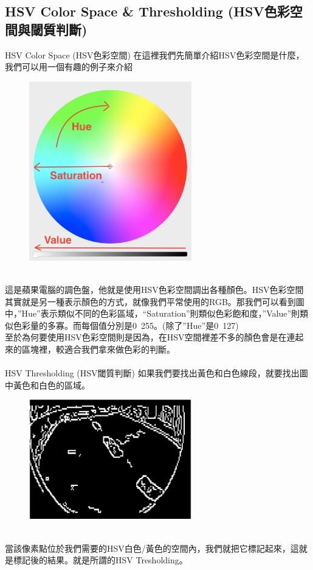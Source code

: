 \documentclass{article}
\begin{document}
\subsection{HSV Color Space \& Thresholding (HSV色彩空間與閾質判斷)}
HSV Color Space (HSV色彩空間)
在這裡我們先簡單介紹HSV色彩空間是什麼，我們可以用一個有趣的例子來介紹
\begin{figure}[htp]
    \begin{center}
        \includegraphics[width=200pt]{pic/3_2_8.png}
    \end{center}
\end{figure}
\\
這是蘋果電腦的調色盤，他就是使用HSV色彩空間調出各種顏色。HSV色彩空間其實就是另一種表示顏色的方式，就像我們平常使用的RGB。那我們可以看到圖中，”Hue”表示類似不同的色彩區域，“Saturation”則類似色彩飽和度，”Value”則類似色彩量的多寡。而每個值分別是0~255。(除了”Hue”是0~127)
\\至於為何要使用HSV色彩空間則是因為，在HSV空間裡差不多的顏色會是在連起來的區塊裡，較適合我們拿來做色彩的判斷。
\\\\HSV Thresholding (HSV閾質判斷)
如果我們要找出黃色和白色線段，就要找出圖中黃色和白色的區域。
\begin{figure}[htp]
    \begin{center}
        \includegraphics[width=200pt]{pic/3_2_9.png}
    \end{center}
\end{figure}
\\
當該像素點位於我們需要的HSV白色/黃色的空間內，我們就把它標記起來，這就是標記後的結果。就是所謂的HSV Tresholding。
\end{document}
